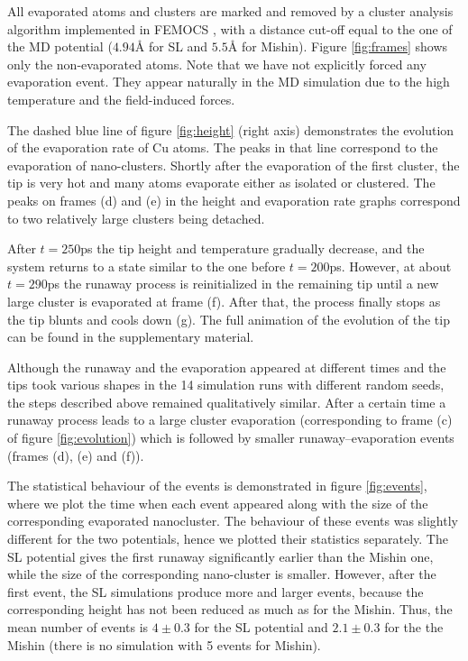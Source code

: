 \documentclass[%
 aps,
 prb,%
 amsmath,amssymb,
reprint,%
superscriptaddress,
]{revtex4-1}
\begin{document}
All evaporated atoms and clusters are marked and removed by a cluster analysis algorithm \cite{ester1996density} implemented in FEMOCS \cite{VekseDynamic_arxiv}, with a distance cut-off equal to the one of the MD potential ($4.94 \textrm{\AA}$ for SL and $5.5 \textrm{\AA}$ for Mishin).
Figure \ref{fig:frames} shows only the non-evaporated atoms.
Note that we have not explicitly forced any evaporation event.
They appear naturally in the MD simulation due to the high temperature and the field-induced forces.

The dashed blue line of figure \ref{fig:height} (right axis) demonstrates the evolution of the evaporation rate of Cu atoms. The peaks in that line correspond to the evaporation of nano-clusters.
Shortly after the evaporation of the first cluster, the tip is very hot and many atoms evaporate either as isolated or clustered. The peaks on frames (d) and (e) in the height and evaporation rate graphs correspond to two relatively large clusters being detached.

After $t = 250$ps the tip height and temperature gradually decrease, and the system returns to a state similar to the one before $t=200$ps. 
However, at about $t = 290$ps the runaway process is reinitialized in the remaining tip until a new large cluster is evaporated at frame (f).
After that, the process finally stops as the tip blunts and cools down (g).
The full animation of the evolution of the tip can be found in the supplementary material.

Although the runaway and the evaporation appeared at different times and the tips took various shapes in the 14 simulation runs with different random seeds, the steps described above remained qualitatively similar. 
After a certain time a runaway process leads to a large cluster evaporation (corresponding to frame (c) of figure \ref{fig:evolution}) which is followed by smaller runaway--evaporation events (frames (d), (e) and (f)). 

The statistical behaviour of the events is demonstrated in figure \ref{fig:events}, where we plot the time when each event appeared along with the size of the corresponding evaporated nanocluster. 
The behaviour of these events was slightly different for the two potentials, hence we plotted their statistics separately. 
The SL potential gives the first runaway significantly earlier than the Mishin one, while the size of the corresponding nano-cluster is smaller. 
However, after the first event, the SL simulations produce more and larger events, because the corresponding height has not been reduced as much as for the Mishin.
Thus, the mean number of events is $4 \pm 0.3$ for the SL potential and $2.1 \pm 0.3$ for the the Mishin (there is no simulation with 5 events for Mishin).
\end{document}
